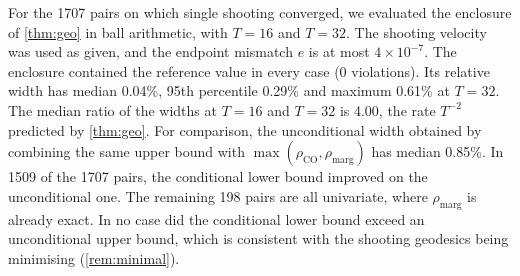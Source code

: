 For the 1707 pairs on which single shooting converged, we evaluated the enclosure of \cref{thm:geo} in ball arithmetic, with $T=16$ and $T=32$. The shooting velocity was used as given, and the endpoint mismatch $e$ is at most $4\times10^{-7}$. The enclosure contained the reference value in every case (0 violations). Its relative width has median 0.04\%, 95th percentile 0.29\% and maximum 0.61\% at $T=32$. The median ratio of the widths at $T=16$ and $T=32$ is 4.00, the rate $T^{-2}$ predicted by \cref{thm:geo}. For comparison, the unconditional width obtained by combining the same upper bound with $\max(\rho_{\mathrm{CO}},\rho_{\mathrm{marg}})$ has median 0.85\%. In 1509 of the 1707 pairs, the conditional lower bound improved on the unconditional one. The remaining 198 pairs are all univariate, where $\rho_{\mathrm{marg}}$ is already exact. In no case did the conditional lower bound exceed an unconditional upper bound, which is consistent with the shooting geodesics being minimising (\cref{rem:minimal}).